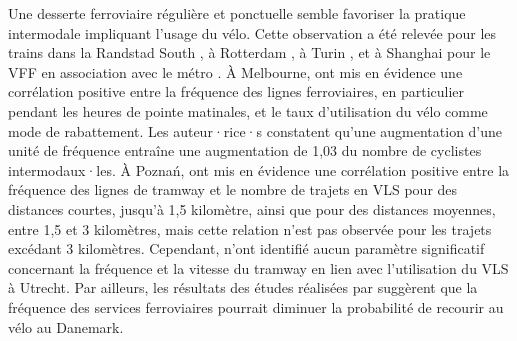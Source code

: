 \begin{refsegment}
Une desserte ferroviaire régulière et ponctuelle semble favoriser la pratique intermodale impliquant l'usage du vélo. Cette observation a été relevée pour les trains dans la Randstad South \textcolor{blue}{\autocite[45]{la_paix_puello_modelling_2015}}, à Rotterdam \textcolor{blue}{\autocite[5]{montes_shared_2023}}, à Turin \textcolor{blue}{\autocite[12]{staricco_implementing_2020}}, et à Shanghai pour le \acrshort{VFF} en association avec le métro \textcolor{blue}{\autocite[24]{lin_analysis_2019}}. À Melbourne, \textcolor{blue}{\textcite[401]{weliwitiya_bicycle_2019}} ont mis en évidence une corrélation positive entre la fréquence des lignes ferroviaires, en particulier pendant les heures de pointe matinales, et le taux d'utilisation du vélo comme mode de rabattement. Les auteur·rice·s constatent qu'une augmentation d'une unité de fréquence entraîne une augmentation de 1,03 du nombre de cyclistes intermodaux·les. À Poznań, \textcolor{blue}{\textcite[199]{radzimski_exploring_2021}} ont mis en évidence une corrélation positive entre la fréquence des lignes de tramway et le nombre de trajets en \acrshort{VLS} pour des distances courtes, jusqu'à 1,5 kilomètre, ainsi que pour des distances moyennes, entre 1,5 et 3 kilomètres, mais cette relation n'est pas observée pour les trajets excédant 3 kilomètres. Cependant, \textcolor{blue}{\textcite[301]{kuijk_preferences_2022}} n'ont identifié aucun paramètre significatif concernant la fréquence et la vitesse du tramway en lien avec l'utilisation du \acrshort{VLS} à Utrecht. Par ailleurs, les résultats des études réalisées par \textcolor{blue}{\textcite[41]{nielsen_bikeability_2018}} suggèrent que la fréquence des services ferroviaires pourrait diminuer la probabilité de recourir au vélo au Danemark.%


\end{refsegment}
